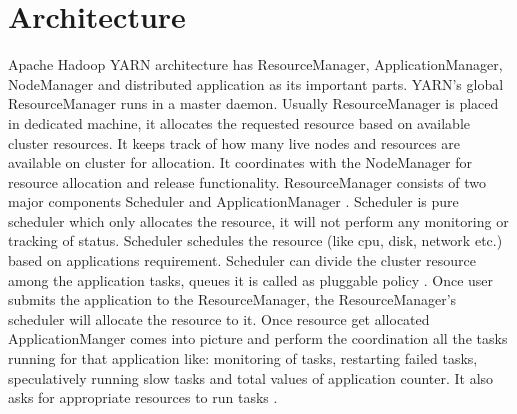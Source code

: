 \documentclass[9pt,twocolumn,twoside]{../../styles/osajnl}
\begin{document}

\section{Architecture}
Apache Hadoop YARN architecture has ResourceManager, ApplicationManager, NodeManager and distributed application as its important parts. YARN’s global ResourceManager runs in a master daemon. Usually ResourceManager is placed in dedicated machine, it allocates the requested resource based on available cluster resources. It keeps track of how many live nodes and resources are available on cluster for allocation. It coordinates with the NodeManager for resource allocation and release functionality. ResourceManager consists of two major components Scheduler and ApplicationManager \cite{www-2}.
Scheduler is pure scheduler which only allocates the resource, it will not perform any monitoring or tracking of status. Scheduler schedules the resource (like cpu, disk, network etc.) based on applications requirement. Scheduler can divide the cluster resource among the application tasks, queues it is called as pluggable policy \cite{www-2}. Once user submits the application to the ResourceManager, the ResourceManager’s scheduler will allocate the resource to it. Once resource get allocated ApplicationManger comes into picture and perform the coordination all the tasks running for that application like: monitoring of tasks, restarting failed tasks, speculatively running slow tasks and total values of application counter. It also asks for appropriate resources to run tasks \cite{www-4}.
\end{document}
